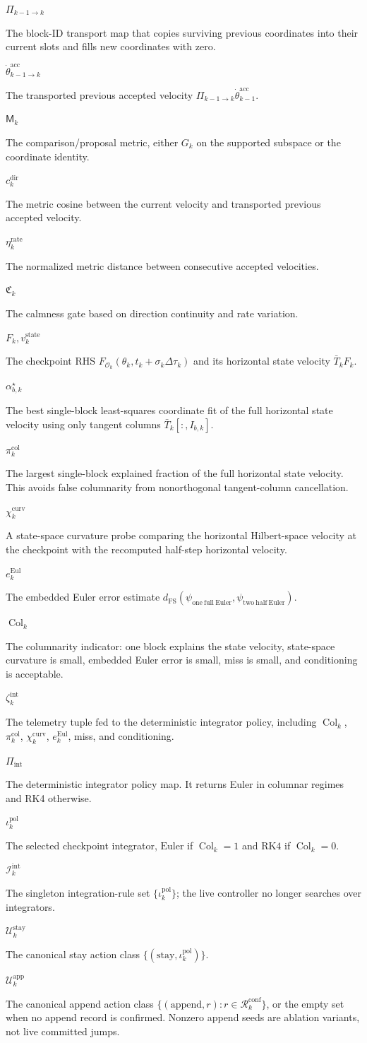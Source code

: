 \documentclass[10pt]{article}
\newcommand{\sym}[2]{%
  \noindent\begin{minipage}[t]{0.29\textwidth}\raggedright\textbf{\ensuremath{#1}}\end{minipage}%
  \hfill
  \begin{minipage}[t]{0.68\textwidth}\raggedright #2\end{minipage}\par\vspace{0.22em}}
\begin{document}
\sym{\Pi_{k-1\to k}}{The block-ID transport map that copies surviving previous coordinates into their current slots and fills new coordinates with zero.}
\sym{\dot\theta_{k-1\to k}^{\mathrm{acc}}}{The transported previous accepted velocity $\Pi_{k-1\to k}\dot\theta_{k-1}^{\mathrm{acc}}$.}
\sym{\mathsf M_k}{The comparison/proposal metric, either $G_k$ on the supported subspace or the coordinate identity.}
\sym{c_k^{\mathrm{dir}}}{The metric cosine between the current velocity and transported previous accepted velocity.}
\sym{\eta_k^{\mathrm{rate}}}{The normalized metric distance between consecutive accepted velocities.}
\sym{\mathfrak C_k}{The calmness gate based on direction continuity and rate variation.}
\sym{F_k,v_k^{\mathrm{state}}}{The checkpoint RHS $F_{\mathcal O_k}(\theta_k,t_k+\sigma_k\Delta\tau_k)$ and its horizontal state velocity $\bar T_kF_k$.}
\sym{\alpha_{b,k}^{\star}}{The best single-block least-squares coordinate fit of the full horizontal state velocity using only tangent columns $\bar T_k[:,I_{b,k}]$.}
\sym{\pi_k^{\mathrm{col}}}{The largest single-block explained fraction of the full horizontal state velocity. This avoids false columnarity from nonorthogonal tangent-column cancellation.}
\sym{\chi_k^{\mathrm{curv}}}{A state-space curvature probe comparing the horizontal Hilbert-space velocity at the checkpoint with the recomputed half-step horizontal velocity.}
\sym{e_k^{\mathrm{Eul}}}{The embedded Euler error estimate $d_{\mathrm{FS}}(\psi_{\mathrm{one\ full\ Euler}},\psi_{\mathrm{two\ half\ Euler}})$.}
\sym{\operatorname{Col}_k}{The columnarity indicator: one block explains the state velocity, state-space curvature is small, embedded Euler error is small, miss is small, and conditioning is acceptable.}
\sym{\zeta_k^{\mathrm{int}}}{The telemetry tuple fed to the deterministic integrator policy, including $\operatorname{Col}_k$, $\pi_k^{\mathrm{col}}$, $\chi_k^{\mathrm{curv}}$, $e_k^{\mathrm{Eul}}$, miss, and conditioning.}
\sym{\Pi_{\mathrm{int}}}{The deterministic integrator policy map. It returns Euler in columnar regimes and RK4 otherwise.}
\sym{\iota_k^{\mathrm{pol}}}{The selected checkpoint integrator, $\mathrm{Euler}$ if $\operatorname{Col}_k=1$ and $\mathrm{RK4}$ if $\operatorname{Col}_k=0$.}
\sym{\mathcal I_k^{\mathrm{int}}}{The singleton integration-rule set $\{\iota_k^{\mathrm{pol}}\}$; the live controller no longer searches over integrators.}
\sym{\mathcal U_k^{\mathrm{stay}}}{The canonical stay action class $\{(\mathrm{stay},\iota_k^{\mathrm{pol}})\}$.}
\sym{\mathcal U_k^{\mathrm{app}}}{The canonical append action class $\{(\mathrm{append},r):r\in\mathcal R_k^{\mathrm{conf}}\}$, or the empty set when no append record is confirmed. Nonzero append seeds are ablation variants, not live committed jumps.}
\end{document}
